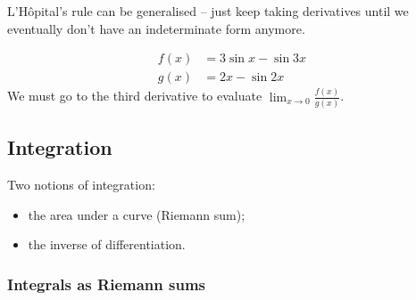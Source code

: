 \documentclass{../template/note}
\begin{document}

    L'H\^opital's rule can be generalised -- just keep taking derivatives until we eventually don't have an indeterminate form anymore.

    \begin{example}
        \begin{align*}
            f(x) &= 3 \sin x - \sin 3x \\
            g(x) &= 2x - \sin 2x
        \end{align*}
        We must go to the third derivative to evaluate \(\lim_{x \to 0}\frac{f(x)}{g(x)}\).        
    \end{example}
    
    \subsection{Integration}

    Two notions of integration:

    \begin{itemize}
        \item the area under a curve (Riemann sum);
        \item the inverse of differentiation.
    \end{itemize}
    
    \subsubsection{Integrals as Riemann sums}
\end{document}
